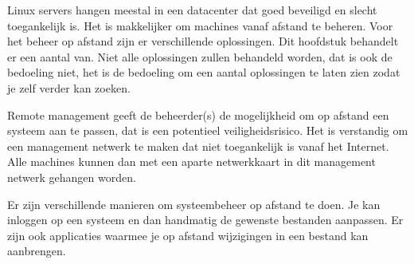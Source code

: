 Linux servers hangen meestal in een datacenter dat goed beveiligd en slecht toegankelijk is. Het is makkelijker om machines vanaf afstand te beheren. Voor het beheer op afstand zijn er verschillende oplossingen. Dit hoofdstuk behandelt er een aantal van. Niet alle oplossingen zullen behandeld worden, dat is ook de bedoeling niet, het is de bedoeling om een aantal oplossingen te laten zien zodat je zelf verder kan zoeken.

Remote management geeft de beheerder(s) de mogelijkheid om op afstand een systeem aan te passen, dat is een potentieel veiligheidsrisico. Het is verstandig om een management netwerk te maken dat niet toegankelijk is vanaf het Internet. Alle machines kunnen dan met een aparte netwerkkaart in dit management netwerk gehangen worden.

Er zijn verschillende manieren om systeembeheer op afstand te doen. Je kan inloggen op een systeem en dan handmatig de gewenste bestanden aanpassen. Er zijn ook applicaties waarmee je op afstand wijzigingen in een bestand kan aanbrengen.

